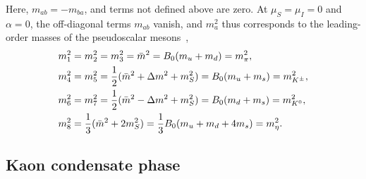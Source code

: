 %
Here, $m_{ab} = -m_{ba}$, and terms not defined above are zero.
At $\mu_S = \mu_I = 0$ and $\alpha = 0$, the off-diagonal terms $m_{ab}$ vanish, and $m_a^2$ thus corresponds to the leading-order masses of the pseudoscalar mesons~\autocite{eckerChiralPerturbationTheory1995},
%
\begin{align}
    m_1^2 & = m_2^2 = m_3^2 
    = \bar m^2 
    = B_0(m_u + m_d) = m_\pi^2, \\
    m_4^2 & = m_5^2 
    = \frac{1}{2} (\bar m^2 + \Delta m^2 + m_S^2) 
    = B_0(m_u + m_s) = m_{{K^\pm}}^2, \\
    m_6^2 &= m_7^2 
    = \frac{1}{2} (\bar m^2 - \Delta m^2 + m_S^2) 
    = B_0(m_d + m_s) = m_{{K^0} }^2, \\
    m_8^2 
    &= \frac{1}{3}(\bar m^2  + 2m_S^2) 
    = \frac{1}{3}B_0(m_u + m_d + 4m_s) = m_\eta^2 .
\end{align}
%



\subsection{Kaon condensate phase}

